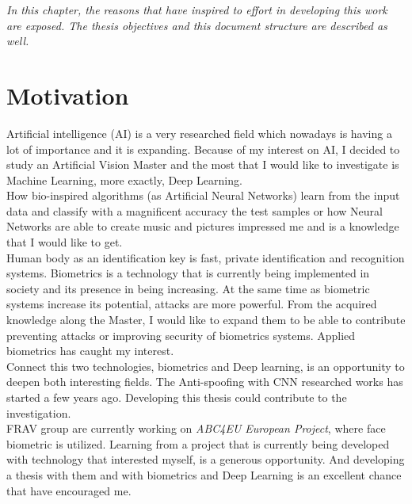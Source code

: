 \minitoc
\mtcskip

\begin{small}
\emph{In this chapter, the reasons that have inspired to effort in developing this work are exposed. The thesis objectives and this document structure are described as well.\\}
\end{small}
\section{Motivation}
Artificial intelligence (AI) is a very researched field which nowadays is having a lot of importance and it is expanding. Because of my interest on AI,  I decided to study an Artificial Vision Master and the most that I would like to investigate is Machine Learning, more exactly, Deep Learning.\\

How bio-inspired algorithms (as Artificial Neural Networks) learn from the input data and classify with a magnificent accuracy the test samples or how Neural Networks are able to create music and pictures impressed me and is a knowledge that I would like to get.\\

Human body as an identification key is fast, private identification and recognition systems. Biometrics is a technology that is currently being implemented in society and its presence in being increasing. At the same time as biometric systems increase its potential, attacks are more powerful. From the acquired knowledge along the Master, I would like to expand them to be able to contribute preventing attacks or improving security of biometrics systems. Applied biometrics has caught my interest. \\

Connect this two technologies, biometrics and Deep learning, is an opportunity to deepen both interesting fields. The Anti-spoofing with CNN researched works has started a few years ago. Developing this thesis could contribute to the investigation.\\

FRAV group are currently working on \textit{ABC4EU European Project}, where face biometric is utilized. Learning from a project that is currently being developed with technology that interested myself, is a generous opportunity. And developing a thesis with them and with biometrics and Deep Learning is an excellent chance that have encouraged me.\\


